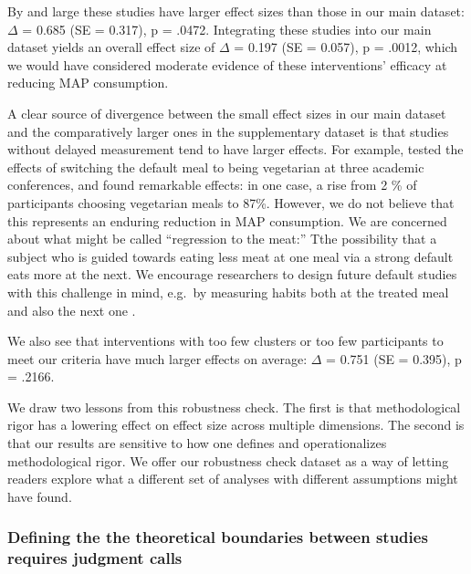 \documentclass[sn-nature,referee,pdflatex]{sn-jnl}
\begin{document}
By and large these studies have larger effect sizes than those in our
main dataset: \(\Delta\) = 0.685 (SE = 0.317), p = .0472. Integrating
these studies into our main dataset yields an overall effect size of
\(\Delta\) = 0.197 (SE = 0.057), p = .0012, which we would have
considered moderate evidence of these interventions' efficacy at
reducing MAP consumption.

A clear source of divergence between the small effect sizes in our main
dataset and the comparatively larger ones in the supplementary dataset
is that studies without delayed measurement tend to have larger effects.
For example, \citep{hansen2021} tested the effects of switching the
default meal to being vegetarian at three academic conferences, and
found remarkable effects: in one case, a rise from 2 \% of participants
choosing vegetarian meals to 87\%. However, we do not believe that this
represents an enduring reduction in MAP consumption. We are concerned
about what might be called ``regression to the meat:'' Tthe possibility
that a subject who is guided towards eating less meat at one meal via a
strong default eats more at the next. We encourage researchers to design
future default studies with this challenge in mind, e.g.~by measuring
habits both at the treated meal and also the next one
\citep{vocski2024}.

We also see that interventions with too few clusters or too few
participants to meet our criteria have much larger effects on average:
\(\Delta\) = 0.751 (SE = 0.395), p = .2166.

We draw two lessons from this robustness check. The first is that
methodological rigor has a lowering effect on effect size across
multiple dimensions. The second is that our results are sensitive to how
one defines and operationalizes methodological rigor. We offer our
robustness check dataset as a way of letting readers explore what a
different set of analyses with different assumptions might have found.

\subsubsection{Defining the the theoretical boundaries between studies
requires judgment calls}\label{sec5.4.4}
\end{document}
